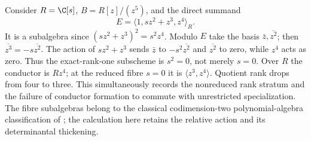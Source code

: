 \begin{remark}\label{ex:conductor-rank-jump}
Consider $R=\C[s]$, $B=R[z]/(z^5)$, and the direct summand
\[
 E=\langle1,sz^2+z^3,z^4\rangle_R.
\]
It is a subalgebra since $(sz^2+z^3)^2=s^2z^4$. Modulo $E$ take the
basis $\bar z,\overline{z^2}$; then $\overline{z^3}=-s\overline{z^2}$.
The action of $sz^2+z^3$ sends $\bar z$ to $-s^2\overline{z^2}$ and
$\overline{z^2}$ to zero, while $z^4$ acts as zero. Thus the
exact-rank-one subscheme is \emph{$s^2=0$}, not merely $s=0$.
Over $R$ the conductor is $Rz^4$; at the reduced fibre $s=0$ it is
$\langle z^3,z^4\rangle$. Quotient rank drops from four to three.
This simultaneously records the nonreduced rank stratum and the failure
of conductor formation to commute with unrestricted specialization.
The fibre subalgebras belong to the classical codimension-two
polynomial-algebra classification of \cite[Theorem 39]{GLTU}; the
calculation here retains the relative action and its determinantal
thickening.
\end{remark}
